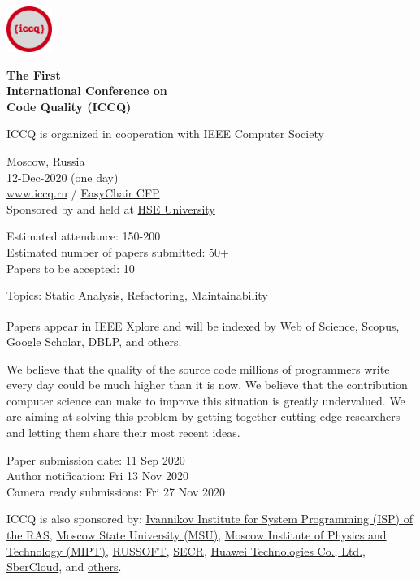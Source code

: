 \documentclass[12pt,oneside]{article}
\begin{document}
\selectfont
\raggedbottom
\raggedright
\setlength{\topskip}{6pt}
\setlength{\parindent}{0pt} %
\setlength{\parskip}{6pt} %

\includegraphics[height=4em]{../logo}

\textcolor{xred}{\bfseries
{\large The First} \\
{\Large International Conference on\\[3pt]
Code Quality (ICCQ)}}

ICCQ is organized in cooperation with IEEE Computer Society

\vspace{6pt}

Moscow, Russia \\
12-Dec-2020 (one day) \\
\href{https://www.iccq.ru}{www.iccq.ru} / \href{https://easychair.org/cfp/ICCQ20}{EasyChair CFP}\\

Sponsored by and held at \href{https://www.hse.ru/en/}{HSE University}

Estimated attendance: 150-200 \\
Estimated number of papers submitted: 50+ \\
Papers to be accepted: 10

\vspace{6pt}

Topics: Static Analysis, Refactoring, Maintainability

Papers appear in IEEE Xplore\textsuperscript{\textregistered}
and will be indexed by Web of Science, Scopus, Google Scholar, DBLP, and others.

We believe that the quality of the source code millions of programmers
write every day could be much higher than it is now. We believe that the
contribution computer science can make to improve this situation is greatly
undervalued. We are aiming at solving this problem by getting
together cutting edge researchers and letting them share their most recent ideas.

\vspace{6pt}

Paper submission date: 11 Sep 2020 \\
Author notification: Fri 13 Nov 2020 \\
Camera ready submissions: Fri 27 Nov 2020

\vspace{6pt}

ICCQ is also sponsored by:
\href{https://www.ispras.ru/en/}{Ivannikov Institute for System Programming (ISP) of the RAS},
\href{https://www.msu.ru/}{Moscow State University (MSU)},
\href{https://mipt.ru/english/}{Moscow Institute of Physics and Technology (MIPT)},
\href{https://russoft.org/en/}{RUSSOFT},
\href{https://2021.secrus.org/?lang=en}{SECR},
\href{https://www.huawei.com}{Huawei Technologies Co., Ltd.},
\href{https://sbercloud.ru/}{SberCloud},
and \href{https://www.iccq.ru/#partners}{others}.
\end{document}
